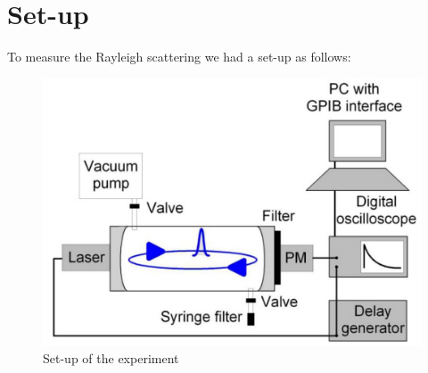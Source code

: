 \documentclass[
	parskip=half,10pt,
	numbers= noenddot, %
	toc=flat, %
	oneside,
	twocolumn,
	]{scrartcl}
\begin{document}
\section{Set-up}
To measure the Rayleigh scattering we had a set-up as follows:
\begin{figure}[h]
\includegraphics[width = .48 \textwidth]{images/aufbau.pdf}
\caption{Set-up of the experiment \citep{wiki}}
\label{fig:experiment}
\end{figure}
\end{document}
